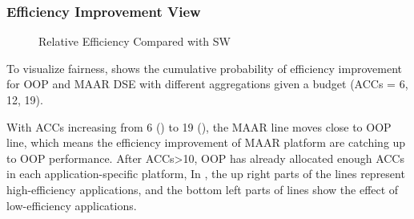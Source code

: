 \subsubsection{Efficiency Improvement View}
\label{subsubsec:agg-sw}

\begin{figure*}[]
\vspace{-10pt}
	\centering
		\hfill
        \hfill
\vspace{-8pt}
	\caption{Relative Efficiency Compared with SW}
	\label{fig:OpenVXsw}
\end{figure*}

To visualize fairness,  shows the cumulative probability of efficiency improvement for OOP and MAAR DSE with different aggregations given a budget (ACCs = 6, 12, 19).




With ACCs increasing from 6 () to 19 (), the MAAR line moves close to OOP line, which means the efficiency improvement of MAAR platform are catching up to OOP performance. After ACCs>10, OOP has already allocated enough ACCs in each application-specific platform,  In , the up right parts of the lines represent high-efficiency applications, and the bottom left parts of lines show the effect of low-efficiency applications. 


